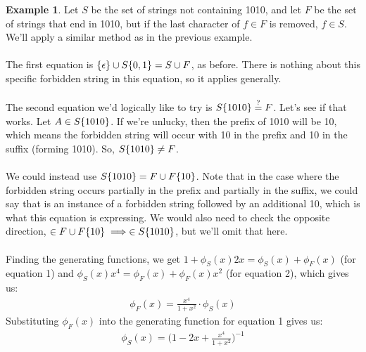 \documentclass[]{article}
\theoremstyle{definition}
\newtheorem{ex}{Example}[section]
\DeclarePairedDelimiter{\set}{\lbrace}{\rbrace}
\begin{document}
				\begin{ex}
					Let $S$ be the set of strings not containing 1010, and let $F$ be the set of strings that end in 1010, but if the last character of $f \in F$ is removed, $f \in S$. We'll apply a similar method as in the previous example.
					\\ \\
					The first equation is $\set{\epsilon } \cup S\set{0, 1} = S \cup F$, as before. There is nothing about this specific forbidden string in this equation, so it applies generally.
					\\ \\
					The second equation we'd logically like to try is $S \set{1010 } \stackrel{?}{=} F$. Let's see if that works. Let $A \in S\set{1010}$. If we're unlucky, then the prefix of 1010 will be 10, which means the forbidden string will occur with 10 in the prefix and 10 in the suffix (forming 1010). So, $S\set{1010} \not = F$.
					\\ \\
					We could instead use $S\set{1010} = F \cup F\set{10}$. Note that in the case where the forbidden string occurs partially in the prefix and partially in the suffix, we could say that is an instance of a forbidden string followed by an additional 10, which is what this equation is expressing. We would also need to check the opposite direction, $\in F \cup F\set{10} \implies \in S\set{1010}$, but we'll omit that here.
					\\ \\
					Finding the generating functions, we get $1 + \phi_S(x) 2x = \phi_S(x) + \phi_F(x)$ (for equation 1) and $\phi_S(x) x^4 = \phi_F(x) + \phi_F(x) x^2$ (for equation 2), which gives us:
					\begin{align*}
						\phi_F(x) = \frac{x^4}{1 + x^2} \cdot \phi_S(x)
					\end{align*}
					Substituting $\phi_F(x)$ into the generating function for equation 1 gives us:
					\begin{align*}
						\phi_S(x) = \bigg(1 - 2x + \frac{x^4}{1 + x^2}\bigg)^{-1}
					\end{align*}
				\end{ex}
\end{document}
